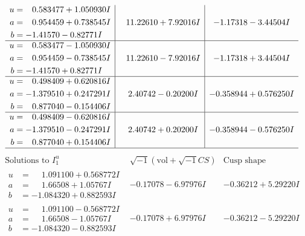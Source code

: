 \documentclass[1p]{elsarticle_modified}
\theoremstyle{definition}
\newcommand{\I}{\sqrt{-1}}
\begin{document}
$$\begin{array}{c|c|c}
\begin{aligned}
u &= \phantom{-}0.583477 + 1.050930 I \\
a &= \phantom{-}0.954459 + 0.738545 I \\
b &= -1.41570 - 0.82771 I\end{aligned}
 & \phantom{-}11.22610 + 7.92016 I & -1.17318 - 3.44504 I \\ \hline\begin{aligned}
u &= \phantom{-}0.583477 - 1.050930 I \\
a &= \phantom{-}0.954459 - 0.738545 I \\
b &= -1.41570 + 0.82771 I\end{aligned}
 & \phantom{-}11.22610 - 7.92016 I & -1.17318 + 3.44504 I \\ \hline\begin{aligned}
u &= \phantom{-}0.498409 + 0.620816 I \\
a &= -1.379510 + 0.247291 I \\
b &= \phantom{-}0.877040 - 0.154406 I\end{aligned}
 & \phantom{-}2.40742 - 0.20200 I & -0.358944 + 0.576250 I \\ \hline\begin{aligned}
u &= \phantom{-}0.498409 - 0.620816 I \\
a &= -1.379510 - 0.247291 I \\
b &= \phantom{-}0.877040 + 0.154406 I\end{aligned}
 & \phantom{-}2.40742 + 0.20200 I & -0.358944 - 0.576250 I\\
 \hline 
 \end{array}$$\newpage$$\begin{array}{c|c|c}  
\text{Solutions to }I^u_{1}& \I (\text{vol} + \sqrt{-1}CS) & \text{Cusp shape}\\
 \hline 
\begin{aligned}
u &= \phantom{-}1.091100 + 0.568772 I \\
a &= \phantom{-}1.66508 + 1.05767 I \\
b &= -1.084320 + 0.882593 I\end{aligned}
 & -0.17078 - 6.97976 I & -0.36212 + 5.29220 I \\ \hline\begin{aligned}
u &= \phantom{-}1.091100 - 0.568772 I \\
a &= \phantom{-}1.66508 - 1.05767 I \\
b &= -1.084320 - 0.882593 I\end{aligned}
 & -0.17078 + 6.97976 I & -0.36212 - 5.29220 I \\ \hline\begin{aligned}

\end{aligned}
\end{array}$$
\end{document}

